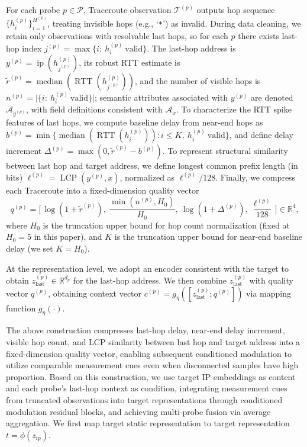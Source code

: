 \documentclass[runningheads]{llncs}
\begin{document}
For each probe $p\in\mathcal{P}$, Traceroute observation $\mathcal{T}^{(p)}$ outputs hop sequence $\{h_i^{(p)}\}_{i=1}^{H^{(p)}}$, treating invisible hops (e.g., `\verb|*|') as invalid. During data cleaning, we retain only observations with resolvable last hops, so for each $p$ there exists last-hop index $j^{(p)}=\max\{i:\ h_i^{(p)}\ \text{valid}\}$. The last-hop address is $y^{(p)}=\operatorname{ip}(h_{j^{(p)}}^{(p)})$, its robust RTT estimate is $\tilde{r}^{(p)}=\operatorname{median}(\operatorname{RTT}(h_{j^{(p)}}^{(p)}))$, and the number of visible hops is $n^{(p)}=\big|\{i:\ h_i^{(p)}\ \text{valid}\}\big|$; semantic attributes associated with $y^{(p)}$ are denoted $\mathcal{A}_{y^{(p)}}$, with field definitions consistent with $\mathcal{A}_x$. To characterize the RTT spike features of last hops, we compute baseline delay from near-end hops as $b^{(p)}=\min\{\operatorname{median}(\operatorname{RTT}(h_i^{(p)})): i\le K,\ h_i^{(p)}\ \text{valid}\}$, and define delay increment $\Delta^{(p)}=\max(0,\tilde{r}^{(p)}-b^{(p)})$. To represent structural similarity between last hop and target address, we define longest common prefix length (in bits) $\ell^{(p)}=\operatorname{LCP}(y^{(p)},x)$, normalized as $\ell^{(p)}/128$. Finally, we compress each Traceroute into a fixed-dimension quality vector
\begin{equation}
q^{(p)}=\Big[\, \log(1+\tilde{r}^{(p)}),\ \frac{\min(n^{(p)},H_0)}{H_0},\ \log(1+\Delta^{(p)}),\ \frac{\ell^{(p)}}{128}\, \Big]\in\mathbb{R}^{4},
\label{eq:quality_vector}
\end{equation}
where $H_0$ is the truncation upper bound for hop count normalization (fixed at $H_0=5$ in this paper), and $K$ is the truncation upper bound for near-end baseline delay (we set $K=H_0$).

At the representation level, we adopt an encoder consistent with the target to obtain $z^{(p)}_{\text{last}}\in\mathbb{R}^{d_p}$ for the last-hop address. We then combine $z^{(p)}_{\text{last}}$ with quality vector $q^{(p)}$, obtaining context vector $c^{(p)} = g_\eta([z^{(p)}_{\text{last}}; q^{(p)}])$ via mapping function $g_\eta(\cdot)$.

The above construction compresses last-hop delay, near-end delay increment, visible hop count, and LCP similarity between last hop and target address into a fixed-dimension quality vector, enabling subsequent conditioned modulation to utilize comparable measurement cues even when disconnected samples have high proportion. Based on this construction, we use target IP embeddings as content and each probe's last-hop context as condition, integrating measurement cues from truncated observations into target representations through conditioned modulation residual blocks, and achieving multi-probe fusion via average aggregation. We first map target static representation to target representation $t=\phi(z_{\text{ip}})$.
\end{document}
